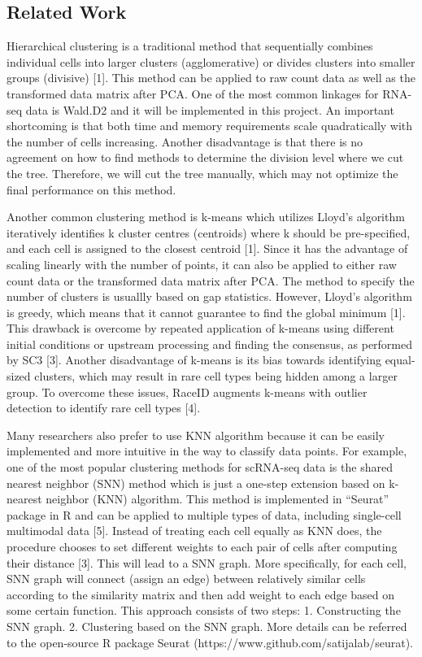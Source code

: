 \documentclass[12pt]{article}
\theoremstyle{definition}
\begin{document}
\subsection{Related Work}

Hierarchical clustering is a traditional method that sequentially combines individual cells into larger clusters (agglomerative) or divides clusters into smaller groups (divisive) [1]. This method can be applied to raw count data as well as the transformed data matrix after PCA. One of the most common linkages for RNA-seq data is Wald.D2 and it will be implemented in this project. An important shortcoming is that both time and memory requirements scale quadratically with the number of cells increasing. Another disadvantage is that there is no agreement on how to find methods to determine the division level where we cut the tree. Therefore, we will cut the tree manually, which may not optimize the final performance on this method.

Another common clustering method is k-means which utilizes Lloyd’s algorithm iteratively identifies k cluster centres (centroids) where k should be pre-specified, and each cell is assigned to the closest centroid [1]. Since it has the advantage of scaling linearly with the number of points, it can also be applied to either raw count data or the transformed data matrix after PCA. The method to specify the number of clusters is usuallly based on gap statistics. However, Lloyd’s algorithm is greedy, which means that it cannot guarantee to find the global minimum [1]. This drawback is overcome by repeated application of k-means using different initial conditions or upstream processing and finding the consensus, as performed by SC3 [3]. Another disadvantage of k-means is its bias towards identifying equal-sized clusters, which may result in rare cell types being hidden among a larger group. To overcome these issues, RaceID augments k-means with outlier detection to identify rare cell types [4].

Many researchers also prefer to use KNN algorithm because it can be easily implemented and more intuitive in the way to classify data points. For example, one of the most popular clustering methods for scRNA-seq data is the shared nearest neighbor (SNN) method which is just a one-step extension based on k-nearest neighbor (KNN) algorithm. This method is implemented in “Seurat” package in R and can be applied to multiple types of data, including single-cell multimodal data [5]. Instead of treating each cell equally as KNN does, the procedure chooses to set different weights to each pair of cells after computing their distance [3]. This will lead to a SNN graph. More specifically, for each cell, SNN graph will connect (assign an edge) between relatively similar cells according to the similarity matrix and then add weight to each edge based on some certain function. This approach consists of two steps: 1. Constructing the SNN graph. 2. Clustering based on the SNN graph. More details can be referred to the open-source R package Seurat (https://www.github.com/satijalab/seurat).
\end{document}
